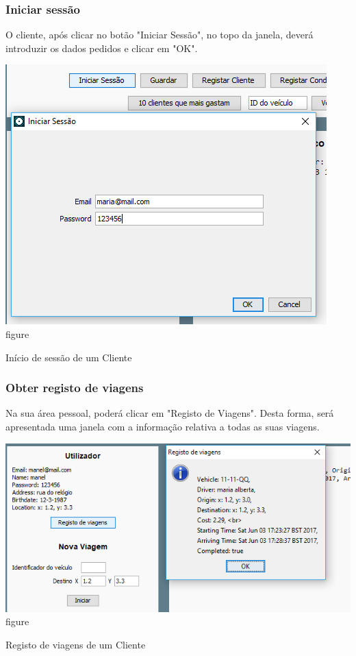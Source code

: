 \documentclass[a4paper]{article}
\begin{document}
\subsubsection{Iniciar sessão}
O cliente, após clicar no botão "Iniciar Sessão", no topo da janela, deverá introduzir os dados pedidos e clicar em "OK".
\begin{center}
  \includegraphics[scale=0.75]{cliente_iniciarsessao}\\
  \caption{figure}{Início de sessão de um Cliente}
  \label{fig:picture}
\end{center}
\subsubsection{Obter registo de viagens}
Na sua área pessoal, poderá clicar em "Registo de Viagens". Desta forma, será apresentada uma janela com a informação relativa a todas as suas viagens.
\begin{center}
  \includegraphics[scale=0.75]{cliente_registo}\\
  \caption{figure}{Registo de viagens de um Cliente}
  \label{fig:picture}
\end{center}
\end{document}
